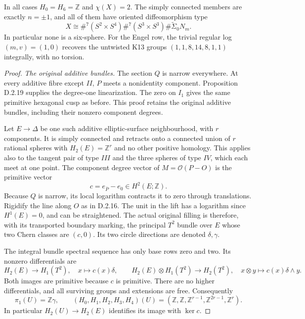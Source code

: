 In all cases $H_0=H_6=\mathbb Z$ and $\chi(X)=2$.
The simply connected members are exactly $n=\pm1$, and
all of them have oriented diffeomorphism type
\[
 X\cong\#^7(S^2\times S^4)\#^7(S^3\times S^3)
                                    \#\widetilde\Sigma_0N_m.
 \tag{D.O3}
\]
In particular none is a six-sphere. For the Engel row,
the trivial regular log $(m,v)=(1,0)$ recovers the
untwisted K13 groups $(1,1,8,14,8,1,1)$ integrally,
with no torsion.
\begin{proof}
\emph{The original additive bundles.}
The section $Q$ is narrow everywhere. At every additive
fibre except $II$, $P$ meets a nonidentity component.
Proposition D.2.19 supplies the degree-one linearization.
The zero on $I_1$ gives the same primitive hexagonal
cusp as before. This proof retains the original additive
bundles, including their nonzero component degrees.

Let $E\to\Delta$ be one such additive elliptic-surface
neighbourhood, with $r$ components. It is simply connected
and retracts onto a connected union of $r$ rational spheres
with $H_2(E)=\mathbb Z^r$ and no other positive homology.
This applies also to the tangent pair of type $III$ and
the three spheres of type $IV$, which each meet at one
point. The component degree vector of $M=\mathcal O(P-O)$
is the primitive vector
\[
                   c=e_{\bar P}-e_0\in H^2(E;\mathbb Z).
\]
Because $Q$ is narrow, its local logarithm contracts it
to zero through translations. Rigidify the line along
$O$ as in D.2.16. The unit in the lift has a logarithm
since $H^1(E)=0$, and can be straightened. The actual
original filling is therefore, with its transported
boundary marking, the principal $T^2$ bundle over $E$
whose two Chern classes are $(c,0)$. Its two circle
directions are denoted $\delta,\gamma$.

The integral bundle spectral sequence has only base
rows zero and two. Its nonzero differentials are
\[
 H_2(E)\longrightarrow H_1(T^2),\quad x\longmapsto c(x)\delta,
 \qquad
 H_2(E)\otimes H_1(T^2)\longrightarrow H_2(T^2),\quad
 x\otimes y\longmapsto c(x)\delta\wedge y.
\]
Both images are primitive because $c$ is primitive.
There are no higher differentials, and all surviving
groups and extensions are free. Consequently
\[
 \pi_1(U)=\mathbb Z\gamma,\qquad
 (H_0,H_1,H_2,H_3,H_4)(U)
  =(\mathbb Z,\mathbb Z,\mathbb Z^{r-1},
                             \mathbb Z^{2r-1},\mathbb Z^r).
 \tag{D.O4}
\]
In particular $H_2(U)\to H_2(E)$ identifies its image
with $\ker c$.


\end{proof}
